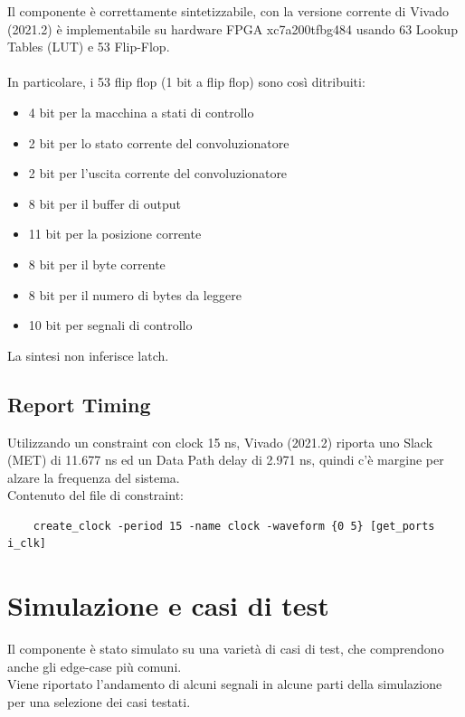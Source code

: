 \documentclass[12pt, a4paper]{article}
\begin{document}
Il componente è correttamente sintetizzabile, con la versione corrente di Vivado (2021.2) è implementabile su hardware FPGA
xc7a200tfbg484 usando 63 Lookup Tables (LUT) e 53 Flip-Flop.
\\
\\
\noindent In particolare, i 53 flip flop (1 bit a flip flop) sono così ditribuiti:
\begin{itemize}[itemsep=4pt, topsep=4pt]
    \item 4 bit per la macchina a stati di controllo
    \item 2 bit per lo stato corrente del convoluzionatore
    \item 2 bit per l'uscita corrente del convoluzionatore
    \item 8 bit per il buffer di output
    \item 11 bit per la posizione corrente
    \item 8 bit per il byte corrente
    \item 8 bit per il numero di bytes da leggere
    \item 10 bit per segnali di controllo
\end{itemize}

\noindent La sintesi non inferisce latch.

\subsection{Report Timing}

Utilizzando un constraint con clock 15 ns, Vivado (2021.2) riporta
uno Slack (MET) di 11.677 ns ed un Data Path delay di 2.971 ns, quindi c'è margine per
alzare la frequenza del sistema.
\\

\noindent Contenuto del file di constraint:
\begin{verbatim}
    create_clock -period 15 -name clock -waveform {0 5} [get_ports i_clk]
\end{verbatim}

\section{Simulazione e casi di test}

Il componente è stato simulato su una varietà di casi di test, che comprendono anche
gli edge-case più comuni.\\
Viene riportato l'andamento di alcuni segnali in alcune parti della simulazione per una selezione dei casi testati.
\end{document}
